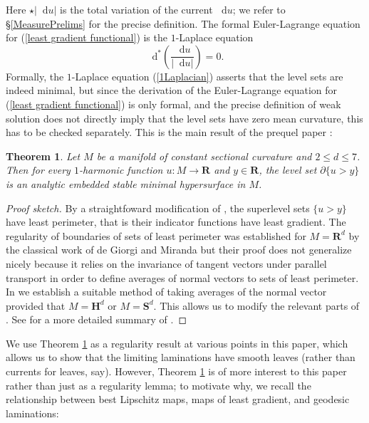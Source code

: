 \documentclass[reqno,11pt]{amsart}
\newcommand{\RR}{\mathbf{R}}
\newcommand{\Hyp}{\mathbf H}
\newcommand{\Sph}{\mathbf S}
\newcommand*\dif{\mathop{}\!\mathrm{d}}
\newtheorem{theorem}{Theorem}[section]
\theoremstyle{definition}
\numberwithin{equation}{section}
\begin{document}
Here $\star |\dif u|$ is the total variation of the current $\dif u$; we refer to \S\ref{MeasurePrelims} for the precise definition.
The formal Euler-Lagrange equation for (\ref{least gradient functional}) is the $1$-Laplace equation
\begin{equation}\label{1Laplacian}
\dif^* \left(\frac{\dif u}{|\dif u|}\right) = 0.
\end{equation}
Formally, the $1$-Laplace equation (\ref{1Laplacian}) asserts that the level sets are indeed minimal, but since the derivation of the Euler-Lagrange equation for (\ref{least gradient functional}) is only formal, and the precise definition of weak solution \cite{Mazon14} does not directly imply that the level sets have zero mean curvature, this has to be checked separately.
This is the main result of the prequel paper \cite{BackusFLG}:

\begin{theorem}\label{main thm of old paper}
Let $M$ be a manifold of constant sectional curvature and $2 \leq d \leq 7$.
Then for every $1$-harmonic function $u: M \to \RR$ and $y \in \RR$, the level set $\partial \{u > y\}$ is an analytic embedded stable minimal hypersurface in $M$.
\end{theorem}
\begin{proof}[Proof sketch]
By a straightfoward modification of \cite[Theorem 1]{BOMBIERI1969}, the superlevel sets $\{u > y\}$ have least perimeter, that is their indicator functions have least gradient.
The regularity of boundaries of sets of least perimeter was established for $M = \RR^d$ by the classical work of de Giorgi and Miranda \cite{deGiorgi61, Miranda66} but their proof does not generalize nicely because it relies on the invariance of tangent vectors under parallel transport in order to define averages of normal vectors to sets of least perimeter.
In \cite[\S3]{BackusFLG} we establish a suitable method of taking averages of the normal vector provided that $M = \Hyp^d$ or $M = \Sph^d$.
This allows us to modify the relevant parts of \cite{Miranda66}.
See \cite[\S1]{BackusFLG} for a more detailed summary of \cite{BackusFLG}.
\end{proof}

We use Theorem \ref{main thm of old paper} as a regularity result at various points in this paper, which allows us to show that the limiting laminations have smooth leaves (rather than currents for leaves, say).
However, Theorem \ref{main thm of old paper} is of more interest to this paper rather than just as a regularity lemma; to motivate why, we recall the relationship between best Lipschitz maps, maps of least gradient, and geodesic laminations:
\end{document}
